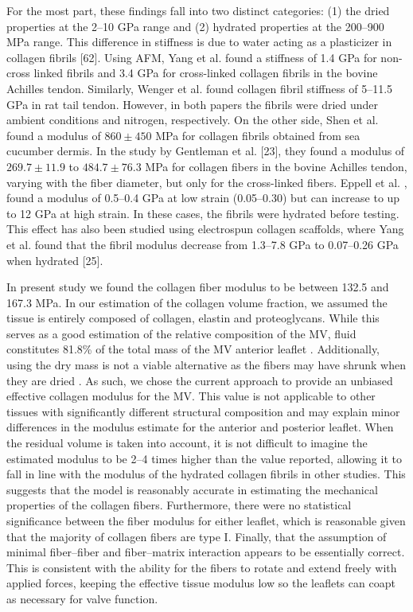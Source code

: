     For the most part, these findings fall into two distinct categories: (1) the dried properties at the 2–10 GPa range and (2) hydrated properties at the 200–900 MPa range. This difference in stiffness is due to water acting as a plasticizer in collagen fibrils [62]. Using AFM, Yang et al. \cite{yang_micromechanical_2007} found a stiffness of 1.4 GPa for non-cross linked fibrils and 3.4 GPa for cross-linked collagen fibrils in the bovine Achilles tendon. Similarly, Wenger et al. \cite{wenger_mechanical_2007} found collagen fibril stiffness of 5–11.5 GPa in rat tail tendon. However, in both papers the fibrils were dried under ambient conditions and nitrogen, respectively. On the other side, Shen et al. \cite{shen_stress_2008} found a modulus of $860\pm450$ MPa for collagen fibrils obtained from sea cucumber dermis. In the study by Gentleman et al. [23], they found a modulus of $269.7\pm11.9$ to $484.7\pm76.3$ MPa for collagen fibers in the bovine Achilles tendon, varying with the fiber diameter, but only for the cross-linked fibers. Eppell et al. \cite{eppell_nano_2006}, found a modulus of 0.5–0.4 GPa at low strain (0.05–0.30) but can increase to up to 12 GPa at high strain. In these cases, the fibrils were hydrated before testing. This effect has also been studied using electrospun collagen scaffolds, where Yang et al. found that the fibril modulus decrease from 1.3–7.8 GPa to 0.07–0.26 GPa when hydrated [25].


    In present study we found the collagen fiber modulus to be between 132.5 and 167.3 MPa. In our estimation of the collagen volume fraction, we assumed the tissue is entirely composed of collagen, elastin and proteoglycans. While this serves as a good estimation of the relative composition of the MV, fluid constitutes 81.8\% of the total mass of the MV anterior leaflet \cite{lis_biochemical_1987}. Additionally, using the dry mass is not a viable alternative as the fibers may have shrunk when they are dried \cite{leikin_raman_1997}. As such, we chose the current approach to provide an unbiased effective collagen modulus for the MV. This value is not applicable to other tissues with significantly different structural composition and may explain minor differences in the modulus estimate for the anterior and posterior leaflet. When the residual volume is taken into account, it is not difficult to imagine the estimated modulus to be 2–4 times higher than the value reported, allowing it to fall in line with the modulus of the hydrated collagen fibrils in other studies. This suggests that the model is reasonably accurate in estimating the mechanical properties of the collagen fibers. Furthermore, there were no statistical significance between the fiber modulus for either leaflet, which is reasonable given that the majority of collagen fibers are type I. Finally, that the assumption of minimal fiber–fiber and fiber–matrix interaction appears to be essentially correct. This is consistent with the ability for the fibers to rotate and extend freely with applied forces, keeping the effective tissue modulus low so the leaflets can coapt as necessary for valve function.
    
